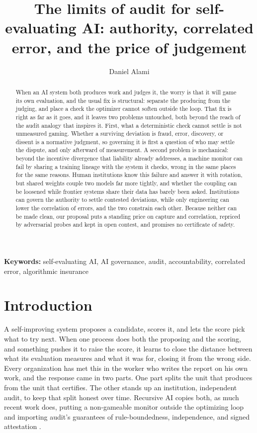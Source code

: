 \documentclass[11pt]{article}
\title{The limits of audit for self-evaluating AI: authority, correlated error, and the price of judgement}
\author{Daniel Alami}\date{}
\begin{document}
\maketitle
\begin{abstract}
When an AI system both produces work and judges it, the worry is that it will game its own evaluation, and the usual fix is structural: separate the producing from the judging, and place a check the optimizer cannot soften outside the loop. That fix is right as far as it goes, and it leaves two problems untouched, both beyond the reach of the audit analogy that inspires it. First, what a deterministic check cannot settle is not unmeasured gaming. Whether a surviving deviation is fraud, error, discovery, or dissent is a normative judgment, so governing it is first a question of who may settle the dispute, and only afterward of measurement. A second problem is mechanical: beyond the incentive divergence that liability already addresses, a machine monitor can fail by sharing a training lineage with the system it checks, wrong in the same places for the same reasons. Human institutions know this failure and answer it with rotation, but shared weights couple two models far more tightly, and whether the coupling can be loosened while frontier systems share their data has barely been asked. Institutions can govern the authority to settle contested deviations, while only engineering can lower the correlation of errors, and the two constrain each other. Because neither can be made clean, our proposal puts a standing price on capture and correlation, repriced by adversarial probes and kept in open contest, and promises no certificate of safety.
\end{abstract}
\noindent\textbf{Keywords:} self-evaluating AI, AI governance, audit, accountability, correlated error, algorithmic insurance

\section{Introduction}

A self-improving system proposes a candidate, scores it, and lets the score pick what to try next. When one process does both the proposing and the scoring, and something pushes it to raise the score, it learns to close the distance between what its evaluation measures and what it was for, closing it from the wrong side. Every organization has met this in the worker who writes the report on his own work, and the response came in two parts. One part splits the unit that produces from the unit that certifies. The other stands up an institution, independent audit, to keep that split honest over time. Recursive AI copies both, as much recent work does, putting a non-gameable monitor outside the optimizing loop and importing audit's guarantees of rule-boundedness, independence, and signed attestation \citep{greenblatt2023,raji2020,manheim2025}.
\end{document}
